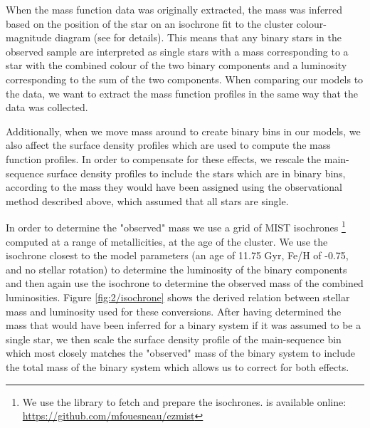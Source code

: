 When the mass function data was originally extracted, the mass was inferred based on the position of
the star on an isochrone fit to the cluster colour-magnitude diagram (see \citealt{Sollima2017} for
details). This means that any binary stars in the observed sample are interpreted as single stars
with a mass corresponding to a star with the combined colour of the two binary components and a
luminosity corresponding to the sum of the two components. When comparing our models to the data, we
want to extract the mass function profiles in the same way that the data was collected.

Additionally, when we move mass around to create binary bins in our models, we also affect the
surface density profiles which are used to compute the mass function profiles. In order to
compensate for these effects, we rescale the main-sequence surface density profiles to include the
stars which are in binary bins, according to the mass they would have been assigned using the
observational method described above, which assumed that all stars are single.

In order to determine the "observed" mass we use a grid of MIST isochrones
\citep{Dotter2016,Choi2016}\footnote{We use the  library to fetch and prepare the
isochrones.  is available online: \url{https://github.com/mfouesneau/ezmist}} computed
at a range of metallicities, at the age of the cluster. We use the isochrone closest to the model
parameters (an age of 11.75 Gyr, Fe/H of -0.75, and no stellar rotation) to determine the luminosity
of the binary components and then again use the isochrone to determine the observed mass of the
combined luminosities. Figure \ref{fig:2/isochrone} shows the derived relation between stellar mass
and luminosity used for these conversions. After having determined the mass that would have been
inferred for a binary system if it was assumed to be a single star, we then scale the surface
density profile of the main-sequence bin which most closely matches the "observed" mass of the
binary system to include the total mass of the binary system which allows us to correct for both
effects.


